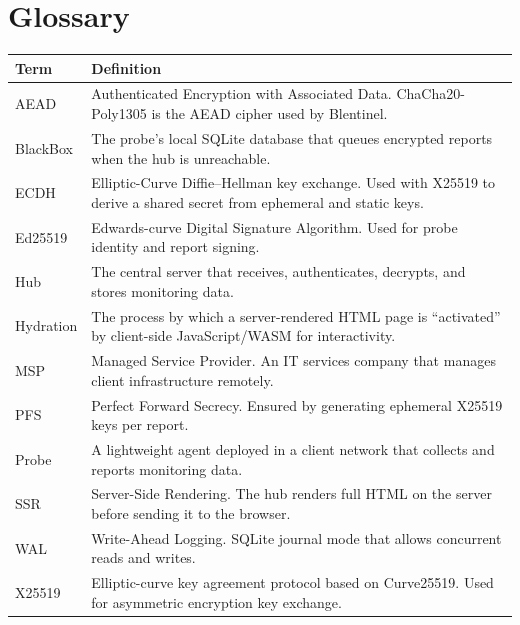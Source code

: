 \documentclass[12pt]{report}
\begin{document}
\section{Glossary}

\begin{longtable}{@{} l p{9cm} @{}}
\toprule
\textbf{Term} & \textbf{Definition} \\
\midrule
AEAD & Authenticated Encryption with Associated Data. ChaCha20-Poly1305 is
    the AEAD cipher used by Blentinel. \\
BlackBox & The probe's local SQLite database that queues encrypted reports
    when the hub is unreachable. \\
ECDH & Elliptic-Curve Diffie--Hellman key exchange. Used with X25519 to
    derive a shared secret from ephemeral and static keys. \\
Ed25519 & Edwards-curve Digital Signature Algorithm. Used for probe identity
    and report signing. \\
Hub & The central server that receives, authenticates, decrypts, and stores
    monitoring data. \\
Hydration & The process by which a server-rendered HTML page is ``activated''
    by client-side JavaScript/WASM for interactivity. \\
MSP & Managed Service Provider. An IT services company that manages client
    infrastructure remotely. \\
PFS & Perfect Forward Secrecy. Ensured by generating ephemeral X25519 keys
    per report. \\
Probe & A lightweight agent deployed in a client network that collects and
    reports monitoring data. \\
SSR & Server-Side Rendering. The hub renders full HTML on the server before
    sending it to the browser. \\
WAL & Write-Ahead Logging. SQLite journal mode that allows concurrent reads
    and writes. \\
X25519 & Elliptic-curve key agreement protocol based on Curve25519. Used for
    asymmetric encryption key exchange. \\
\bottomrule
\end{longtable}
\end{document}
